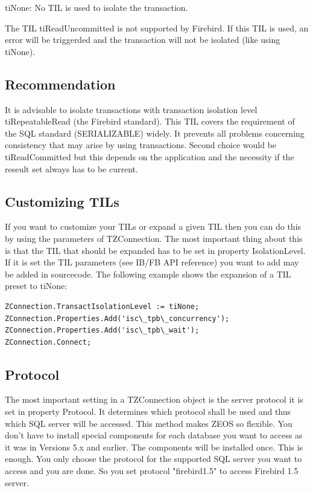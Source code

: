 \documentclass[a4paper,12pt,oneside]{book}
\begin{document}
tiNone: No TIL is used to isolate the transaction.

The TIL tiReadUncommitted is not supported by Firebird.
If this TIL is used, an error will be triggerded and the transaction will not be isolated (like using tiNone).

\subsection{Recommendation}
It is advisable to isolate transactions with transaction isolation level tiRepeatableRead (the Firebird standard).
This TIL covers the requirement of the SQL standard (SERIALIZABLE) widely.
It prevents all problems concerning consistency that may arise by using transactions.
Second choice would be tiReadCommitted but this depends on the application and the necessity if the reseult set always has to be current.

\subsection{Customizing TILs}

If you want to customize your TILs or expand a given TIL then you can do this by using the parameters of TZConnection.
The most important thing about this is that the TIL that should be expanded has to be set in
property IsolationLevel.
If it is set the TIL parameters (see IB/FB API reference) you want to add may be added in sourcecode.
The following example shows the expansion of a TIL preset to tiNone:
\begin{verbatim}
ZConnection.TransactIsolationLevel := tiNone;
ZConnection.Properties.Add('isc\_tpb\_concurrency');
ZConnection.Properties.Add('isc\_tpb\_wait');
ZConnection.Connect;
\end{verbatim}

\subsection{Protocol}
The most important setting in a TZConnection object is the server protocol it is set in property Protocol.
It determines which protocol shall be used and thus which SQL server will be accessed.
This method makes ZEOS so flexible.
You don't have to install special components for each database you want to access as it was in Versions 5.x and earlier.
The components will be installed once.
This is enough.
You only choose the protocol for the supported SQL server you want to access and you are done.
So you set protocol "firebird1.5" to access Firebird 1.5 server.
\end{document}
